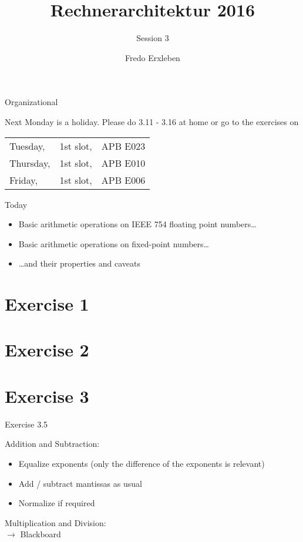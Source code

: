 \documentclass[11pt]{tudbeamer}
\title{Rechnerarchitektur 2016}
\subtitle{Session 3}
\author{Fredo Erxleben}
\begin{document}
  \maketitle

\begin{frame}{Organizational}

	Next Monday is a holiday.
	Please do 3.11 - 3.16 at home or go to the exercises on

	\begin{tabular}{lcc}
		Tuesday, 	&1st slot, &APB E023\\
		Thursday, 	&1st slot, &APB E010\\
		Friday, 		&1st slot, &APB E006\\
	\end{tabular}

\end{frame}

\begin{frame}{Today}

	\begin{itemize}
		\item Basic arithmetic operations on IEEE 754 floating point numbers\dots
		\item Basic arithmetic operations on fixed-point numbers\dots
		\item \dots and their properties and caveats
	\end{itemize} 

\end{frame}

\section{Exercise 1}
\section{Exercise 2}
\section{Exercise 3}

\begin{frame}[allowframebreaks]{Exercise 3.5}

	Addition and Subtraction:\\

	\begin{itemize}
		\item Equalize exponents (only the difference of the exponents is relevant)
		\item Add / subtract mantissas as usual
		\item Normalize if required
	\end{itemize}

\framebreak

	Multiplication and Division: \\
	$\rightarrow$ Blackboard
\end{frame}
\end{document}
